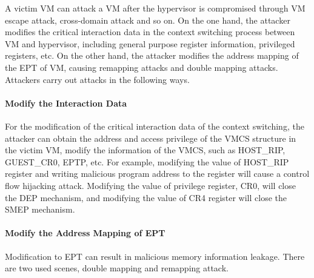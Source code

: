 \documentclass[conference]{IEEEtran}
\begin{document}

A victim VM can attack a VM after the hypervisor is compromised through VM escape attack, cross-domain attack and so on.
On the one hand, the attacker modifies the critical interaction data in the context switching process between VM and hypervisor, including general purpose register information, privileged registers, etc. On the other hand, the attacker modifies the address mapping of the EPT of VM, causing remapping attacks and double mapping attacks. Attackers carry out attacks in the following ways.

\paragraph{Modify the Interaction Data}
For the modification of the critical interaction data of the context switching, the attacker can obtain the address and access privilege of the VMCS structure in the victim VM, modify the information of the VMCS, such as HOST\_RIP, GUEST\_CR0, EPTP, etc. For example, modifying the value of HOST\_RIP register and writing malicious program address to the register will cause a control flow hijacking attack. Modifying the value of privilege register, CR0, will close the DEP mechanism, and modifying the value of CR4 register will close the SMEP mechanism.

\paragraph{Modify the Address Mapping of EPT}
Modification to EPT can result in malicious memory information leakage. There are two used scenes, double mapping and remapping attack.
\end{document}
